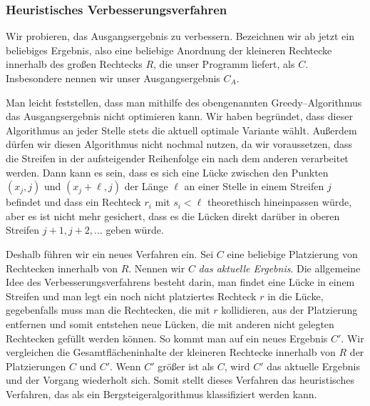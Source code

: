 \subsubsection{Heuristisches Verbesserungsverfahren}
Wir probieren, das Ausgangsergebnis zu verbessern.
Bezeichnen wir ab jetzt ein beliebiges Ergebnis, also eine beliebige Anordnung
der kleineren Rechtecke innerhalb des großen Rechtecks $R$, die unser Programm liefert, 
als $C$. Insbesondere nennen wir unser Ausgangsergebnis $C_A$.


Man leicht feststellen, dass man mithilfe des obengenannten Greedy--Algorithmus 
das Ausgangsergebnis nicht optimieren kann. Wir haben begründet, dass dieser Algorithmus
an jeder Stelle stets die aktuell optimale Variante wählt. 
Außerdem dürfen wir diesen Algorithmus nicht nochmal nutzen,
da wir voraussetzen, dass die Streifen in der aufsteigender Reihenfolge ein nach dem anderen
verarbeitet werden. Dann kann es sein, dass es sich eine Lücke zwischen den Punkten $(x_j, j)$ und 
$(x_j + \ell, j)$ der Länge $\ell$ an einer Stelle in einem Streifen $j$ befindet
und dass ein Rechteck $r_i$ mit $s_i < \ell$ theorethisch hineinpassen würde, aber
es ist nicht mehr gesichert, dass es die Lücken direkt darüber in oberen Streifen $j+1, j+2, ...$
geben würde.


Deshalb führen wir ein neues Verfahren ein. 
Sei $C$ eine beliebige Platzierung von Rechtecken innerhalb von $R$.
Nennen wir $C$ \textit{das aktuelle Ergebnis}. 
Die allgemeine Idee des Verbesserungsverfahrens besteht darin,
man findet eine Lücke in einem Streifen 
und man legt ein noch nicht platziertes Rechteck $r$ in die Lücke, gegebenfalls
muss man die Rechtecken, die mit $r$ kollidieren, aus der Platzierung entfernen
und somit entstehen neue Lücken, die mit anderen nicht gelegten Rechtecken gefüllt werden
können.
So kommt man auf ein neues Ergebnis $C'$.
Wir vergleichen die Gesamtflächeninhalte der kleineren Rechtecke innerhalb von $R$
der Platzierungen $C$ und $C'$. 
Wenn $C'$ größer ist als $C$, wird $C'$ das aktuelle Ergebnis und der Vorgang
wiederholt sich. Somit stellt dieses Verfahren das
heuristisches Verfahren, das als ein Bergsteigeralgorithmus klassifiziert werden kann.
